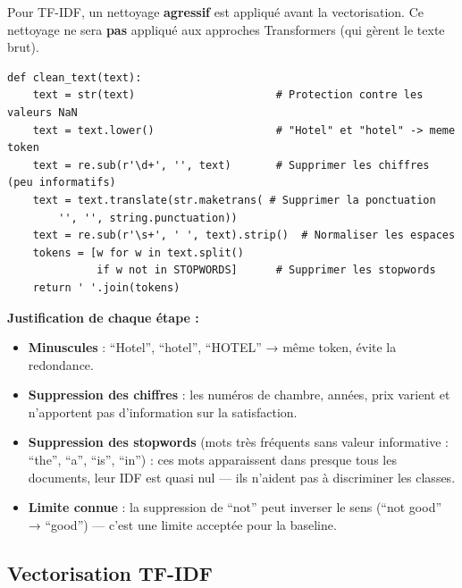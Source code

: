 \documentclass[12pt, a4paper]{article}
\begin{document}
Pour TF-IDF, un nettoyage \textbf{agressif} est appliqué avant la vectorisation.
Ce nettoyage ne sera \textbf{pas} appliqué aux approches Transformers (qui gèrent le texte brut).

\begin{lstlisting}[caption={Fonction de nettoyage pour TF-IDF}]
def clean_text(text):
    text = str(text)                      # Protection contre les valeurs NaN
    text = text.lower()                   # "Hotel" et "hotel" -> meme token
    text = re.sub(r'\d+', '', text)       # Supprimer les chiffres (peu informatifs)
    text = text.translate(str.maketrans( # Supprimer la ponctuation
        '', '', string.punctuation))
    text = re.sub(r'\s+', ' ', text).strip()  # Normaliser les espaces
    tokens = [w for w in text.split()
              if w not in STOPWORDS]      # Supprimer les stopwords
    return ' '.join(tokens)
\end{lstlisting}

\textbf{Justification de chaque étape :}
\begin{itemize}
  \item \textbf{Minuscules} : ``Hotel'', ``hotel'', ``HOTEL'' → même token, évite la redondance.
  \item \textbf{Suppression des chiffres} : les numéros de chambre, années, prix varient
        et n'apportent pas d'information sur la satisfaction.
  \item \textbf{Suppression des stopwords} (mots très fréquents sans valeur informative :
        ``the'', ``a'', ``is'', ``in'') : ces mots apparaissent dans presque tous les documents,
        leur IDF est quasi nul — ils n'aident pas à discriminer les classes.
  \item \textbf{Limite connue} : la suppression de ``not'' peut inverser le sens
        (``not good'' → ``good'') — c'est une limite acceptée pour la baseline.
\end{itemize}

\subsection{Vectorisation TF-IDF}
\end{document}
